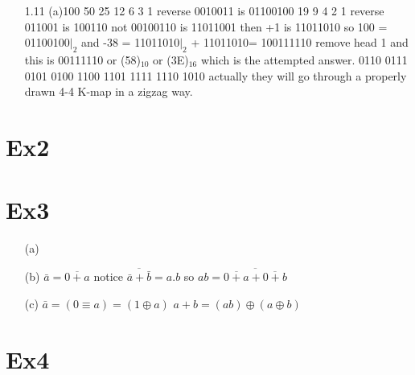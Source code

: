 \documentclass[10pt,twoside,a4paper]{article}
\begin{document}
\begin{enumerate}
\item[1.11]
(a)100 50 25 12 6 3 1 \newline
   reverse 0010011 is 01100100 19 9 4 2 1 \newline
   reverse 011001 is 100110\newline
   not 00100110 is 11011001\newline
   then +1 is 11011010\newline
   so 100 = 01100100$|_2$ and -38 = 11011010$|_2$    + 11011010= 100111110\newline
   remove head 1 and this is 00111110 or (58)$_{10}$ or (3E)$_{16}$ which is the attempted answer. 0110 0111 0101 0100 1100 1101 1111 1110 1010\newline
   actually they will go through a properly drawn 4-4 K-map in a zigzag way.
   

\end{enumerate}
\section{Ex2}

\section{Ex3}
\begin{enumerate}
\item[(a)]
\item[(b)]
$\bar{a}=\overline{0+a}$\newline
notice $\overline{\bar{a}+\bar{b}}=a.b$\newline
so $ab=\overline{\overline{0+a}+\overline{0+b}} $
\item[(c)]
$\bar{a}=(0\equiv a)=(1\oplus a)$\newline
$a+b=(ab)\oplus (a\oplus b)$

\end{enumerate}

\section{Ex4}
\end{document}
